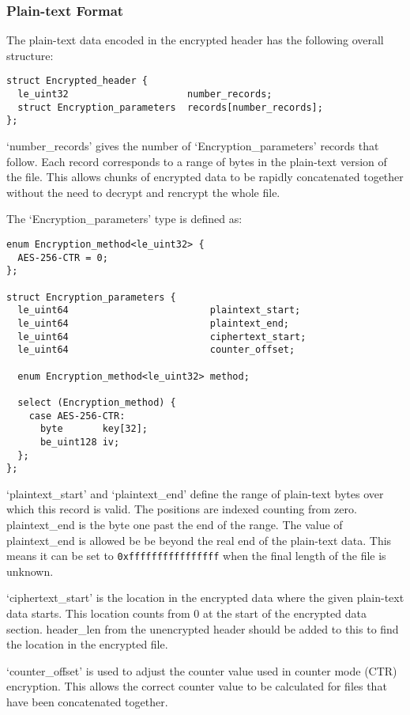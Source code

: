 \documentclass[10pt]{article}
\begin{document}
\subsubsection{Plain-text Format}
The plain-text data encoded in the encrypted header has the following overall structure:
\begin{verbatim}
struct Encrypted_header {
  le_uint32                     number_records;
  struct Encryption_parameters  records[number_records];
};
\end{verbatim}

`number\_records' gives the number of `Encryption\_parameters' records that follow.
Each record corresponds to a range of bytes in the plain-text version of the file.
This allows chunks of encrypted data to be rapidly concatenated together without the need to decrypt and rencrypt the
whole file.

The `Encryption\_parameters' type is defined as:

\begin{verbatim}
enum Encryption_method<le_uint32> {
  AES-256-CTR = 0;
};

struct Encryption_parameters {
  le_uint64                         plaintext_start;
  le_uint64                         plaintext_end;
  le_uint64                         ciphertext_start;
  le_uint64                         counter_offset;

  enum Encryption_method<le_uint32> method;

  select (Encryption_method) {
    case AES-256-CTR:
      byte       key[32];
      be_uint128 iv;
  };
};
\end{verbatim}

`plaintext\_start' and `plaintext\_end' define the range of plain-text bytes over which this record is valid.
The positions are indexed counting from zero.
plaintext\_end is the byte one past the end of the range.
The value of plaintext\_end is allowed be be beyond the real end of the plain-text data.
This means it can be set to \verb+0xffffffffffffffff+ when the final length of the file is unknown.

`ciphertext\_start' is the location in the encrypted data where the given plain-text data starts.
This location counts from 0 at the start of the encrypted data section.
header\_len from the unencrypted header should be added to this to find the location in the encrypted file.

`counter\_offset' is used to adjust the counter value used in counter mode (CTR) encryption.
This allows the correct counter value to be calculated for files that have been concatenated together.
\end{document}
